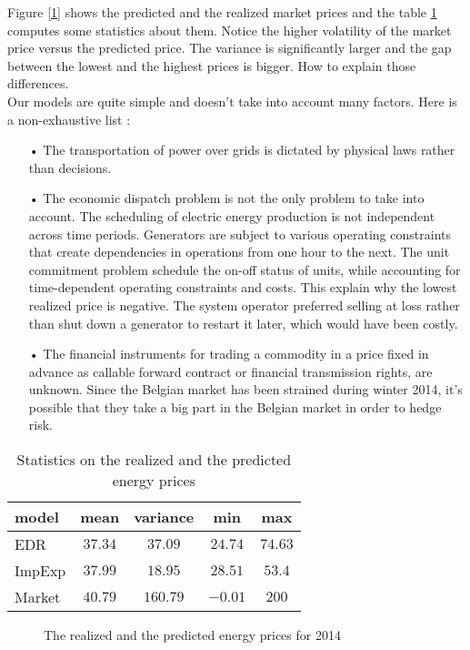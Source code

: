 
Figure [\ref{fig:EDR_IMPEXP}] shows the predicted and the realized market prices and the table \ref{tab1} computes some statistics about them. Notice the higher volatility of the market price versus the predicted price. The variance is significantly larger and the gap between the lowest and the highest prices is bigger. How to explain those differences. \\

Our models are quite simple and doesn't take into account many factors. Here is a non-exhaustive list :

\begin{itemize}
\item[•] The transportation of power over grids is dictated by physical laws rather than decisions.
\item[•] The economic dispatch problem is not the only problem to take into account. The scheduling of electric energy production is not independent across time periods. Generators are subject to various operating constraints that create dependencies in operations from one hour to the next. The unit commitment problem schedule the on-off status of units, while accounting for time-dependent operating constraints and costs. This explain why the lowest realized price is negative. The system operator preferred selling at loss rather than shut down a generator to restart it later, which would have been costly.
\item[•] The financial instruments for trading a commodity in a price fixed in advance as callable forward contract or financial transmission rights, are unknown. Since the Belgian market has been strained during winter 2014, it's possible that they take a big part in the Belgian market in order to hedge risk.
\end{itemize}

\begin{table}[H]
\centering
\begin{tabular}{l | c  c  c  c}
model & mean & variance & min & max \\
\hline
EDR & $37.34$ &  $37.09$ & $24.74$ &  $74.63$ \\
ImpExp & $37.99$ &  $18.95$ & $28.51$ &  $53.4$ \\
\hline
Market & $40.79$ &  $160.79$ & $ -0.01$ &  $200$ \\
\end{tabular}
\caption{Statistics on the realized and the predicted energy prices}
\label{tab1}
\end{table}

\begin{figure}[H]
    \centering
    \setlength{}
    \setlength{}
    
    \caption{The realized and the predicted energy prices for 2014}
    \label{fig:EDR_IMPEXP}
\end{figure}